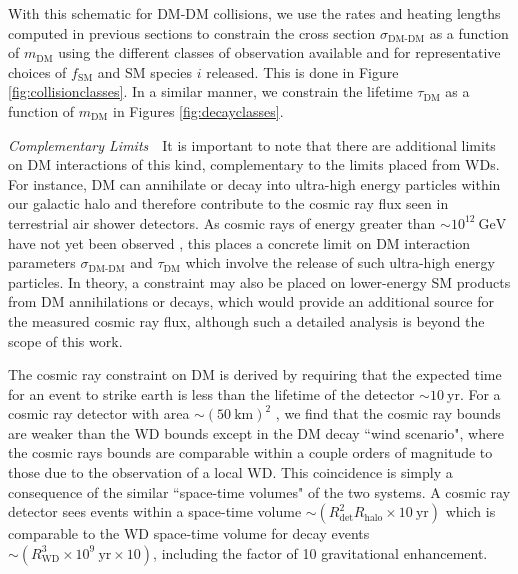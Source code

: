 \documentclass[twocolumn, preprintnumbers,amsmath,amssymb,prd, superscriptaddress]{revtex4}
\newcommand{\GeV}{\text{GeV}}
\begin{document}
With this schematic for DM-DM collisions, we use the rates and heating lengths computed in previous sections to constrain the cross section $\sigma_\text{DM-DM}$ as a function of $m_\text{DM}$ using the different classes of observation available and for representative choices of $f_\text{SM}$ and SM species $i$ released.
This is done in Figure \ref{fig:collisionclasses}.
In a similar manner, we constrain the lifetime $\tau_\text{DM}$ as a function of $m_\text{DM}$ in Figures \ref{fig:decayclasses}.

\emph{Complementary Limits}~~It is important to note that there are additional limits on DM interactions of this kind, complementary to the limits placed from WDs.
For instance, DM can annihilate or decay into ultra-high energy particles within our galactic halo and therefore contribute to the cosmic ray flux seen in terrestrial air shower detectors.
As cosmic rays of energy greater than $\sim 10^{12} ~\GeV$ have not yet been observed \cite{ThePierreAuger:2015rha, AbuZayyad:2012ru}, this places a concrete limit on DM interaction parameters $\sigma_\text{DM-DM}$ and $\tau_\text{DM}$ which involve the release of such ultra-high energy particles.
In theory, a constraint may also be placed on lower-energy SM products from DM annihilations or decays, which would provide an additional source for the measured cosmic ray flux, although such a detailed analysis is beyond the scope of this work.

The cosmic ray constraint on DM is derived by requiring that the expected time for an event to strike earth is less than the lifetime of the detector $\sim 10 ~\text{yr}$.
For a cosmic ray detector with area $ \sim (50~\text{km})^2$ \cite{ThePierreAuger:2015rha}, we find that the cosmic ray bounds are weaker than the WD bounds except in the DM decay ``wind scenario", where the cosmic rays bounds are comparable within a couple orders of magnitude to those due to the observation of a local WD.
This coincidence is simply a consequence of the similar ``space-time volumes" of the two systems.
A cosmic ray detector sees events within a space-time volume $\sim (R_\text{det}^2 R_\text{halo} \times 10 ~\text{yr})$ which is comparable to the WD space-time volume for decay events $\sim (R_\text{WD}^3 \times 10^9 ~\text{yr}\times 10)$, including the factor of 10 gravitational enhancement.
\end{document}

